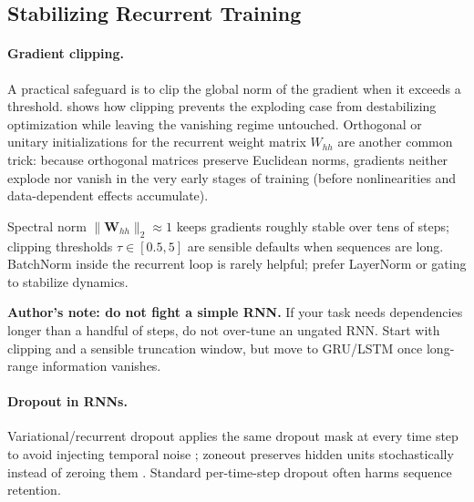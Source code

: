 \subsection{Stabilizing Recurrent Training}
\label{sec:rnn_stabilizing_recurrent_training}

\paragraph{Gradient clipping.} A practical safeguard is to clip the global norm of the gradient when it exceeds a threshold.  shows how clipping prevents the exploding case from destabilizing optimization while leaving the vanishing regime untouched. Orthogonal or unitary initializations for the recurrent weight matrix \(W_{hh}\) are another common trick: because orthogonal matrices preserve Euclidean norms, gradients neither explode nor vanish in the very early stages of training (before nonlinearities and data\hyp{}dependent effects accumulate).

\begin{tcolorbox}[summarybox, title={Stability defaults in practice}]
Spectral norm \(\|\mathbf{W}_{hh}\|_2 \approx 1\) keeps gradients roughly stable over tens of steps; clipping thresholds \(\tau \in [0.5, 5]\) are sensible defaults when sequences are long. BatchNorm inside the recurrent loop is rarely helpful; prefer LayerNorm or gating to stabilize dynamics.
\par\smallskip
\textbf{Author's note: do not fight a simple RNN.} If your task needs dependencies longer than a handful of steps, do not over-tune an ungated RNN. Start with clipping and a sensible truncation window, but move to GRU/LSTM once long-range information vanishes.
\end{tcolorbox}

\paragraph{Dropout in RNNs.} Variational/recurrent dropout applies the same dropout mask at every time step to avoid injecting temporal noise \citep{Gal2016,Semeniuta2016}; zoneout preserves hidden units stochastically instead of zeroing them \citep{Krueger2016}. Standard per-time-step dropout often harms sequence retention.


